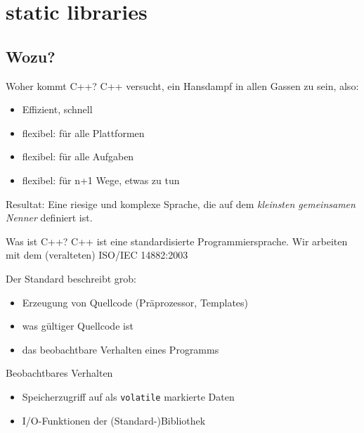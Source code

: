 \section{static libraries}


\subsection{Wozu?}

\begin{frame}{Woher kommt C++?}
	C++ versucht, ein Hansdampf in allen Gassen zu sein, also:
	
	\begin{itemize}
		\item Effizient, schnell
		\item flexibel: für alle Plattformen
		\item flexibel: für alle Aufgaben
		\item flexibel: für n+1 Wege, etwas zu tun
	\end{itemize}
	
	\pause
	\vspace{1em}
	
	\alert{ Resultat: Eine riesige und komplexe Sprache, die auf dem \emph{kleinsten gemeinsamen Nenner} definiert ist. }
\end{frame}

\begin{frame}[fragile]{Was ist C++?}
	C++ ist eine standardisierte Programmiersprache. Wir arbeiten mit dem (veralteten) ISO/IEC 14882:2003
	
	\vspace{1em}
	
	Der Standard beschreibt grob:
	\begin{itemize}
		\item Erzeugung von Quellcode (Präprozessor, Templates)
		\item was gültiger Quellcode ist
		\item das beobachtbare Verhalten eines Programms
	\end{itemize}
	
	\pause
	\vspace{1em}
	
	\begin{block}{Beobachtbares Verhalten}
		\begin{itemize}
			\item Speicherzugriff auf als \verb|volatile| markierte Daten
			\item I/O-Funktionen der (Standard-)Bibliothek
		\end{itemize}
	\end{block}
\end{frame}

